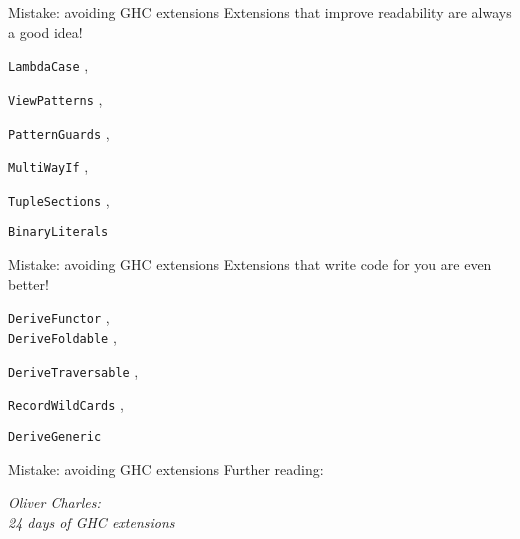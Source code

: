 \documentclass[20pt]{beamer}
\newcommand{\vspaced}{
    \vspace{5mm}
}
\newcommand{\code}[1]{
    \texttt{\small{#1}}
}
\begin{document}
\begin{frame}{Mistake: avoiding GHC extensions}
    Extensions that improve readability are always a good idea! \\
    \vspaced
    \code{LambdaCase},
    \code{ViewPatterns},
    \code{PatternGuards},
    \code{MultiWayIf},
    \code{TupleSections},
    \code{BinaryLiterals}
\end{frame}

\begin{frame}{Mistake: avoiding GHC extensions}
    Extensions that write code for you are even better! \\
    \vspaced
    \code{DeriveFunctor}, \\
    \code{DeriveFoldable},
    \code{DeriveTraversable},
    \code{RecordWildCards},
    \code{DeriveGeneric}
\end{frame}

\begin{frame}{Mistake: avoiding GHC extensions}
    Further reading: \\
    \vspaced
    \emph{Oliver Charles: \\
    24 days of GHC extensions}
\end{frame}
\end{document}
